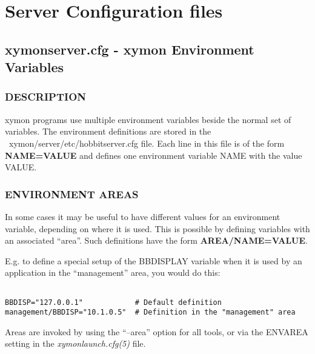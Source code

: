 %
\chapter{Server Configuration files}

%

\section{xymonserver.cfg - xymon Environment Variables }

 
\subsection{DESCRIPTION}
 xymon programs use multiple environment variables beside the normal
 set of variables. The environment definitions are stored in the
 ~xymon/server/etc/hobbitserver.cfg file. Each line in this file is
 of the form \textbf{NAME=VALUE} and defines one environment variable
 NAME with the value VALUE. 


 
\subsection{ENVIRONMENT AREAS}
 In some cases it may be useful to have different values for an
 environment variable, depending on where it is used. This is possible
 by defining variables with an associated ``area''. Such definitions
 have the form \textbf{AREA/NAME=VALUE}. 


  E.g. to define a special setup of the BBDISPLAY variable when it is
  used by an application in the ``management'' area, you would do
  this: 

\begin{verbatim}

BBDISP="127.0.0.1"            # Default definition
management/BBDISP="10.1.0.5"  # Definition in the "management" area

\end{verbatim}



Areas are invoked by using the ``--area'' option for all tools, or via
the ENVAREA setting in the \emph{xymonlaunch.cfg(5)} file. 


